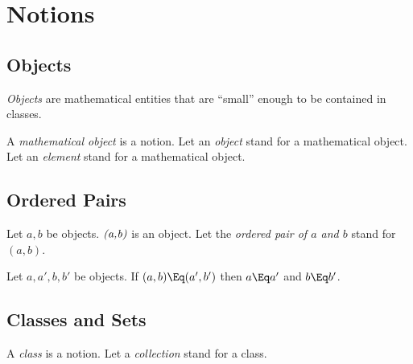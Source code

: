 \documentclass{stex}
\begin{document}


\section{Notions}\label{sec:notions}

\subsection{Objects}\label{sec:objects}

\emph{Objects} are mathematical entities that are ``small'' enough to be
contained in classes.

\begin{fakeforthel}
  \begin{signature*}
    A \emph{mathematical object} is a notion.
    Let an \emph{object} stand for a mathematical object.
    Let an \emph{element} stand for a mathematical object.
  \end{signature*}
\end{fakeforthel}

\subsection{Ordered Pairs}\label{sec:ordered-pairs}

\begin{fakeforthel}
  \begin{signature*}
    Let $a,b$ be objects.
    $\emph{(a,b)}$ is an object.
    Let the \emph{ordered pair of $a$ and $b$} stand for $(a,b)$.
  \end{signature*}
\end{fakeforthel}

\begin{fakeforthel}
  \begin{axiom*}[forthel,title=Ordered Pair Extensionality]
    Let $a,a',b,b'$ be objects.
    If $(a, b) \Eq (a', b')$ then $a \Eq a'$ and $b \Eq b'$.
  \end{axiom*}
\end{fakeforthel}


\subsection{Classes and Sets}\label{sec:classes-and-sets}

\begin{fakeforthel}
  \begin{signature*}
    A \emph{class} is a notion.
    Let a \emph{collection} stand for a class.
  \end{signature*}
\end{fakeforthel}
\end{document}
